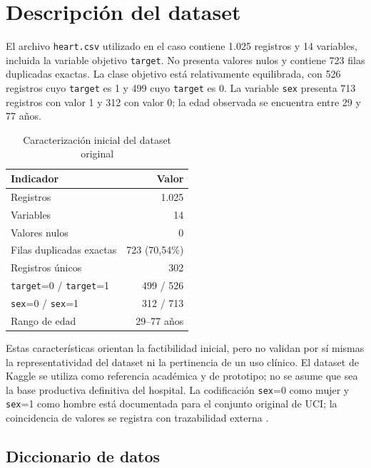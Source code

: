 \section{Descripción del dataset}

El archivo \texttt{heart.csv} utilizado en el caso contiene 1.025 registros y 14 variables, incluida la variable objetivo \texttt{target}. No presenta valores nulos y contiene 723 filas duplicadas exactas. La clase objetivo está relativamente equilibrada, con 526 registros cuyo \texttt{target} es 1 y 499 cuyo \texttt{target} es 0. La variable \texttt{sex} presenta 713 registros con valor 1 y 312 con valor 0; la edad observada se encuentra entre 29 y 77 años.

\begin{table}[H]
  \centering
  \caption{Caracterización inicial del dataset original}
  \label{tab:caracterizacion-dataset}
  \begin{tabular}{lr}
    \toprule
    Indicador & Valor \\
    \midrule
    Registros & 1.025 \\
    Variables & 14 \\
    Valores nulos & 0 \\
    Filas duplicadas exactas & 723 (70,54\%) \\
    Registros únicos & 302 \\
    \texttt{target}=0 / \texttt{target}=1 & 499 / 526 \\
    \texttt{sex}=0 / \texttt{sex}=1 & 312 / 713 \\
    Rango de edad & 29--77 años \\
    \bottomrule
  \end{tabular}
\end{table}

Estas características orientan la factibilidad inicial, pero no validan por sí mismas la representatividad del dataset ni la pertinencia de un uso clínico. El dataset de Kaggle se utiliza como referencia académica y de prototipo; no se asume que sea la base productiva definitiva del hospital. La codificación \texttt{sex}=0 como mujer y \texttt{sex}=1 como hombre está documentada para el conjunto original de UCI; la coincidencia de valores se registra con trazabilidad externa \parencite{uci-heart-disease}.

\subsection{Diccionario de datos}

